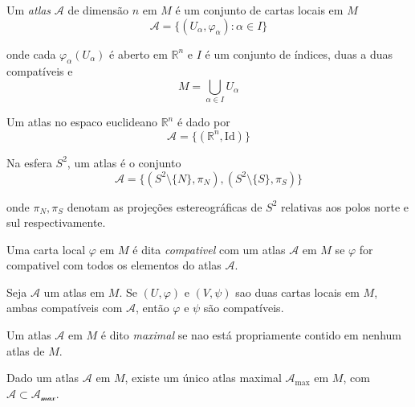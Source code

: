 \begin{defi}
	Um \emph{atlas} $\mathcal{A}$ de dimensão $n$ em $M$ é um conjunto de cartas locais em $M$
	\begin{equation*}
		\mathcal{A} = \{ (U_{\alpha}, \varphi_{\alpha}):  \alpha \in I \}
	\end{equation*}
	
	onde cada $\varphi_{\alpha}(U_{\alpha})$ é aberto em $\mathbb{R}^n$ e $I$ é um conjunto de índices, duas a duas compatíveis e
	\begin{equation*}
		M = \bigcup_{\alpha \in I} U_{\alpha}
	\end{equation*}
\end{defi}

\begin{exemplo}
	Um atlas no espaco euclideano $\mathbb{R}^n$ é dado por
	\begin{equation*}
		\mathcal{A} = \{ (\mathbb{R}^n, \text{Id}) \}
	\end{equation*}
\end{exemplo}

\begin{exemplo}
	Na esfera $S^2$, um atlas é o conjunto
	\begin{equation*}
		\mathcal{A} = \{ (S^2 \setminus \{N\}, \pi_N), (S^2 \setminus \{S\}, \pi_S) \}
	\end{equation*}
	
	onde $\pi_N, \pi_S$ denotam as projeções estereográficas de $S^2$ relativas aos polos norte e sul respectivamente.
\end{exemplo}

\begin{defi}
	Uma carta local $\varphi$ em $M$ é dita \emph{compativel} com um atlas $\mathcal{A}$ em $M$ se $\varphi$ for compativel com todos os elementos do atlas $\mathcal{A}$.
\end{defi}

\begin{lema}
	Seja $\mathcal{A}$ um atlas em $M$. Se $(U, \varphi)$ e $(V, \psi)$ sao duas cartas locais em $M$, ambas compatíveis com $\mathcal{A}$, então $\varphi$ e $\psi$ são compatíveis.
\end{lema}

\begin{defi}
	Um atlas $\mathcal{A}$ em $M$ é dito \emph{maximal} se nao está propriamente contido em nenhum atlas de $M$.
\end{defi}

\begin{lema}
	Dado um atlas $\mathcal{A}$ em $M$, existe um único atlas maximal $\mathcal{A}_{\text{max}}$ em $M$, com $\mathcal{A} \subset \mathcal{A_{\text{max}}}$.
\end{lema}

